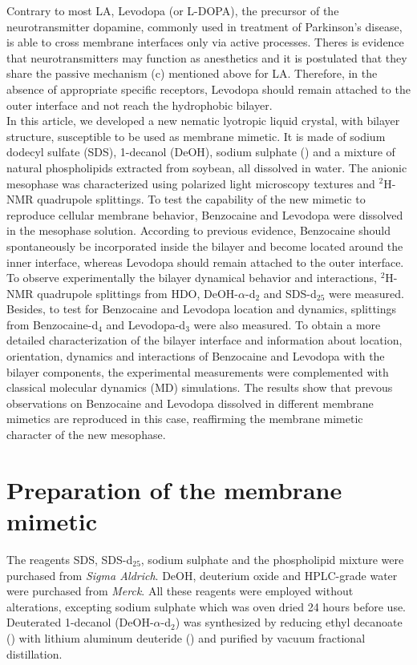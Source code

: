 \documentclass[9pt]{article}
\begin{document}
Contrary to most LA, Levodopa (or L-DOPA), the precursor of the neurotransmitter
dopamine, commonly used in treatment of Parkinson's disease, is able to cross
membrane interfaces only via active processes. Theres is evidence
that neurotransmitters may function as anesthetics and it is postulated that
they share the passive mechanism (c) mentioned above for LA.
Therefore, in the absence of appropriate specific receptors, Levodopa should
remain attached to
the outer interface and not reach the hydrophobic bilayer.\\
In this article, we developed a new nematic lyotropic liquid crystal, with
bilayer structure, susceptible to be used as membrane mimetic. It is made of
sodium dodecyl sulfate (SDS), 1-decanol (DeOH), sodium sulphate () and
a mixture of natural phospholipids extracted from soybean, all dissolved in
water. The anionic mesophase was characterized using polarized light microscopy
textures and $^2$H-NMR quadrupole splittings. To test the capability of the new
mimetic to reproduce cellular membrane behavior, Benzocaine and Levodopa were
dissolved in the mesophase solution. According to previous evidence, Benzocaine
should spontaneously be incorporated inside the bilayer and become located
around the inner interface, whereas Levodopa should remain attached to the outer
interface. To observe experimentally the bilayer dynamical behavior and
interactions, $^2$H-NMR quadrupole splittings from HDO, DeOH-$\alpha$-d$_2$ and
SDS-d$_{25}$ were measured. Besides, to test for Benzocaine and Levodopa
location and dynamics, splittings from Benzocaine-d$_4$ and Levodopa-d$_3$ were
also measured. To obtain a more detailed characterization of the bilayer
interface and information about location, orientation, dynamics and interactions
of Benzocaine and Levodopa with the bilayer components, the experimental
measurements were complemented with classical molecular dynamics (MD)
simulations. The results show that prevous observations on Benzocaine and
Levodopa dissolved in different membrane mimetics are reproduced in this case,
reaffirming the membrane mimetic character of the new mesophase.

\section{Preparation of the membrane mimetic}

The reagents SDS, SDS-d$_{25}$, sodium sulphate and the phospholipid mixture
were purchased from \textit{Sigma Aldrich}. DeOH, deuterium oxide and HPLC-grade
water were purchased from \textit{Merck}. All these reagents were employed
without alterations, excepting sodium sulphate which was oven dried 24 hours
before use.
Deuterated 1-decanol (DeOH-$\alpha$-d$_2$) was synthesized by reducing ethyl
decanoate () with lithium aluminum deuteride () and
purified by vacuum fractional distillation.\\
\end{document}
